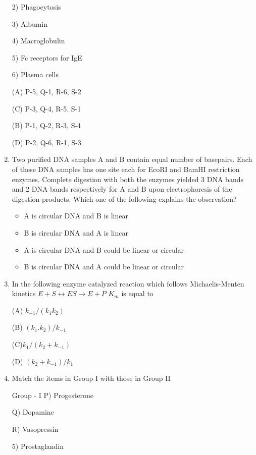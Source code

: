 \documentclass[journal]{IEEEtran}
\begin{document}
\begin{enumerate}
\begin{minipage}{0.5\textwidth}
\begin{flushright}
2) Phagocytosis

3) Albumin

4) Macroglobulin

5) Fc receptors for IgE

6) Plasma cells
		\end{flushright}
		\end{minipage}
(A) P-5, Q-1, R-6, S-2

(C) P-3, Q-4, R-5. S-1

(B) P-1, Q-2, R-3, S-4

(D) P-2, Q-6, R-1, S-3

\item {Two purified DNA samples A and B contain equal number of basepairs. Each of these DNA samples has one site each for EcoRI and BamHI restriction enzymes. Complete digestion with both the enzymes yielded 3 DNA bands and 2 DNA bands respectively for A and B upon electrophoresis of the digestion products. Which one of the following explains the observation?}
	\begin{itemize}
\item[(A)] A is circular DNA and B is linear

\item[(B)] B is circular DNA and A is lincar

\item[(C)] A is circular DNA and B could be linear or circular

\item[(D)] B is circular DNA and A could be linear or circular
	\end{itemize}
\item {In the following enzyme catalyzed reaction which follows Michaelis-Menten kinetics	
	\newline\textbf{ $E + S \leftrightarrow ES \rightarrow E + P$}}
	$K_m$ is equal to

(A) $k_{-1}/(k_1k_2)$

(B) $(k_1. k_2)/k_{-1}$

(C)$ k_1/(k_2+k_{-1})$

(D) $(k_2+k_{-1})/k_1$

\item {Match the items in Group I with those in Group II}
\begin{minipage}{0.5\textwidth}
\begin{flushleft}
	Group - I
P) Progesterone

Q) Dopamine

R) Vasopressin

5) Prostaglandin


\end{flushleft}
\end{minipage}
\end{enumerate}
\end{document}
